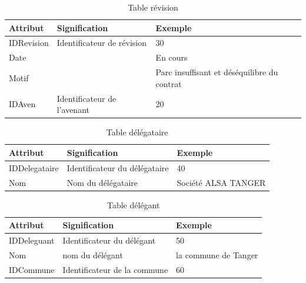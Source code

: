 \documentclass[a4paper]{report}
\begin{document}
\begin{doublespace}
	\begin{table}[H]
		\begin{center}
			\begin{tabularx}{17cm}{|p{4cm}|p{4cm}|X|}
				\hline
				\textbf{Attribut} & \textbf{Signification}      &
				\textbf{Exemple}                                                                              \\
				\hline
				IDRevision        & Identificateur de révision  & 30                                          \\
				\hline
				Date              &                             & En cours                                    \\
				\hline
				Motif             &                             & Parc insuffisant et déséquilibre du contrat \\
				\hline
				IDAven            & Identificateur de l'avenant & 20                                          \\
				\hline
			\end{tabularx}
			\caption{Table révision}
		\end{center}
	\end{table}

	\begin{table}[H]
		\begin{center}
			\begin{tabularx}{17.5cm}{|X|X|X|}
				\hline
				\textbf{Attribut} & \textbf{Signification}        &
				\textbf{Exemple}                                                        \\
				\hline
				IDDelegataire     & Identificateur du délégataire & 40                  \\
				\hline
				Nom               & Nom du délégataire            & Société ALSA TANGER \\
				\hline
			\end{tabularx}
			\caption{Table délégataire}
		\end{center}
	\end{table}

	\begin{table}[H]
		\begin{center}
			\begin{tabularx}{17.5cm}{|X|X|X|}
				\hline
				\textbf{Attribut} & \textbf{Signification}       &
				\textbf{Exemple}                                                        \\
				\hline
				IDDeleguant       & Identificateur du délégant   & 50                   \\
				\hline
				Nom               & nom du délégant              & la commune de Tanger \\
				\hline
				IDCommune         & Identificateur de la commune & 60                   \\
				\hline
			\end{tabularx}
			\caption{Table délégant}
		\end{center}
	\end{table}


\end{doublespace}
\end{document}
